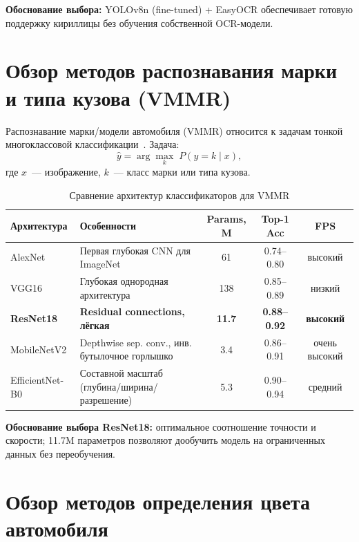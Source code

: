 \documentclass[14pt,a4paper]{report}
\numberwithin{equation}{chapter}
\numberwithin{figure}{chapter}
\numberwithin{table}{chapter}
\begin{document}
\noindent\textbf{Обоснование выбора:} YOLOv8n (fine-tuned) + EasyOCR обеспечивает
готовую поддержку кириллицы без обучения собственной OCR-модели.

\section{Обзор методов распознавания марки и типа кузова (VMMR)}

Распознавание марки/модели автомобиля (VMMR) относится к задачам тонкой
многоклассовой классификации~\cite{vmmr2024,siddiqui2016}. Задача:
\begin{equation}
  \hat{y} = \arg\max_{k}\; P(y = k \mid x),
\end{equation}
где $x$~--- изображение, $k$~--- класс марки или типа кузова.

\begin{table}[H]
\centering
\caption{Сравнение архитектур классификаторов для VMMR}
\label{tab:vmmr_compare}
\begin{tabularx}{\textwidth}{lXccc}
\toprule
\textbf{Архитектура} & \textbf{Особенности} & \textbf{Params, M} & \textbf{Top-1 Acc} & \textbf{FPS} \\
\midrule
AlexNet        & Первая глубокая CNN для ImageNet     & 61   & 0.74--0.80 & высокий \\
VGG16          & Глубокая однородная архитектура      & 138  & 0.85--0.89 & низкий  \\
\textbf{ResNet18} & \textbf{Residual connections, лёгкая} & \textbf{11.7} & \textbf{0.88--0.92} & \textbf{высокий} \\
MobileNetV2    & Depthwise sep. conv., инв. бутылочное горлышко & 3.4 & 0.86--0.91 & очень высокий \\
EfficientNet-B0 & Составной масштаб (глубина/ширина/разрешение) & 5.3 & 0.90--0.94 & средний \\
\bottomrule
\end{tabularx}
\end{table}

\noindent\textbf{Обоснование выбора ResNet18:} оптимальное соотношение
точности и скорости; 11.7M параметров позволяют дообучить модель
на ограниченных данных без переобучения.

\section{Обзор методов определения цвета автомобиля}
\end{document}
